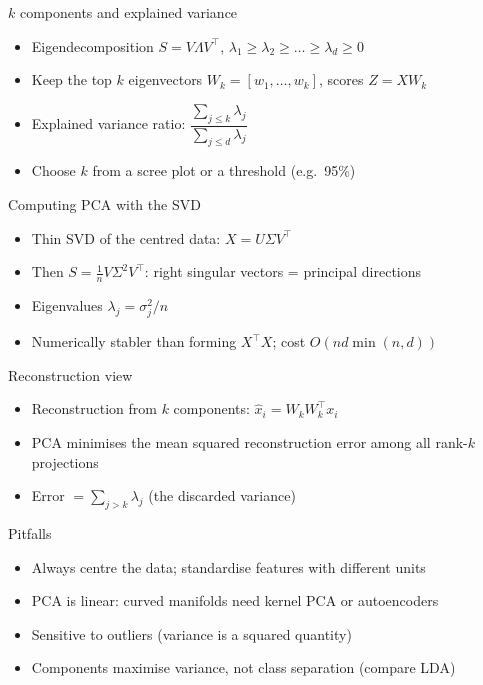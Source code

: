 \documentclass[aspectratio=169]{beamer}
\begin{document}
\begin{frame}{$k$ components and explained variance}
\begin{itemize}
  \item Eigendecomposition $S = V \Lambda V^\top$, $\lambda_1 \ge \lambda_2 \ge \dots \ge \lambda_d \ge 0$
  \item Keep the top $k$ eigenvectors $W_k = [w_1,\dots,w_k]$, scores $Z = X W_k$
  \item Explained variance ratio: $\dfrac{\sum_{j\le k}\lambda_j}{\sum_{j\le d}\lambda_j}$
  \item Choose $k$ from a scree plot or a threshold (e.g.\ 95\%)
\end{itemize}
\end{frame}

\begin{frame}{Computing PCA with the SVD}
\begin{itemize}
  \item Thin SVD of the centred data: $X = U \Sigma V^\top$
  \item Then $S = \frac1n V \Sigma^2 V^\top$: right singular vectors = principal directions
  \item Eigenvalues $\lambda_j = \sigma_j^2 / n$
  \item Numerically stabler than forming $X^\top X$; cost $O(n d \min(n,d))$
\end{itemize}
\end{frame}

\begin{frame}{Reconstruction view}
\begin{itemize}
  \item Reconstruction from $k$ components: $\hat x_i = W_k W_k^\top x_i$
  \item PCA minimises the mean squared reconstruction error among all rank-$k$ projections
  \item Error $= \sum_{j>k} \lambda_j$ (the discarded variance)
\end{itemize}
\end{frame}

\begin{frame}{Pitfalls}
\begin{itemize}
  \item Always centre the data; standardise features with different units
  \item PCA is linear: curved manifolds need kernel PCA or autoencoders
  \item Sensitive to outliers (variance is a squared quantity)
  \item Components maximise variance, not class separation (compare LDA)
\end{itemize}
\end{frame}
\end{document}
